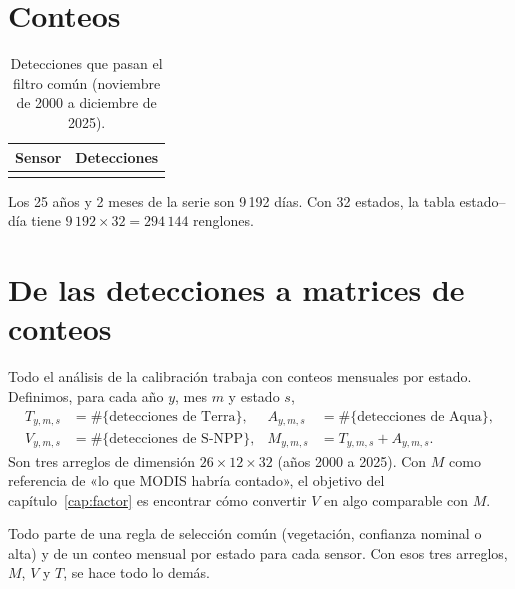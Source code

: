 \section{Conteos}

\begin{table}[H]
\centering
\caption{Detecciones que pasan el filtro común (noviembre de 2000 a diciembre de 2025).}\label{tab:conteos}
\begin{tabular}{@{}lr@{}}
\toprule
Sensor & Detecciones \\
\midrule

\\
\bottomrule
\end{tabular}
\end{table}

Los 25 años y 2 meses de la serie son 9\,192 días. Con 32 estados, la tabla estado--día tiene $9\,192\times 32=294\,144$ renglones.

\section{De las detecciones a matrices de conteos}

Todo el análisis de la calibración trabaja con conteos mensuales por estado. Definimos, para cada año $y$, mes $m$ y estado $s$,
\begin{align*}
  T_{y,m,s}&=\#\{\text{detecciones de Terra}\},&
  A_{y,m,s}&=\#\{\text{detecciones de Aqua}\},\\
  V_{y,m,s}&=\#\{\text{detecciones de S-NPP}\},&
  M_{y,m,s}&=T_{y,m,s}+A_{y,m,s}.
\end{align*}
Son tres arreglos de dimensión $26\times12\times32$ (años 2000 a 2025). Con $M$ como referencia de «lo que MODIS habría contado», el objetivo del capítulo~\ref{cap:factor} es encontrar cómo convertir $V$ en algo comparable con $M$.

\begin{ideaclave}
Todo parte de una regla de selección común (vegetación, confianza nominal o alta) y de un conteo mensual por estado para cada sensor. Con esos tres arreglos, $M$, $V$ y $T$, se hace todo lo demás.
\end{ideaclave}
